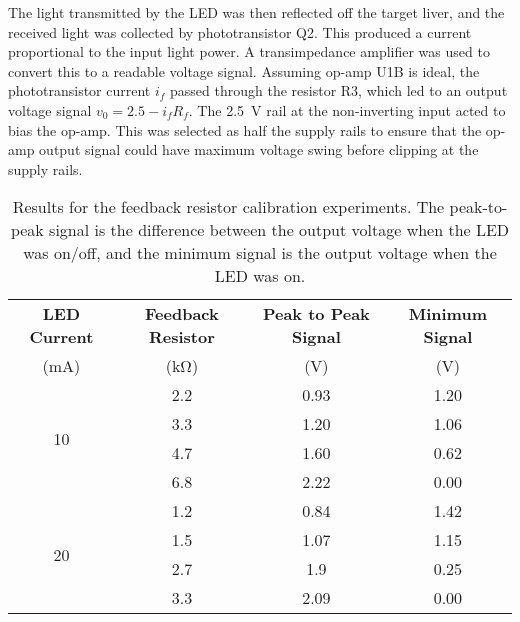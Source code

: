 The light transmitted by the LED was then reflected off the target liver, and the received light was collected by phototransistor Q2. This produced a current proportional to the input light power. A transimpedance amplifier was used to convert this to a readable voltage signal. Assuming op-amp U1B is ideal, the phototransistor current $i_f$ passed through the resistor R3, which led to an output voltage signal $v_0 = 2.5 - i_f R_f$. The \SI{2.5}{\volt} rail at the non-inverting input acted to bias the op-amp. This was selected as half the supply rails to ensure that the op-amp output signal could have maximum voltage swing before clipping at the supply rails.\\

\begin{table}[ht]
	\centering
	\caption{Results for the feedback resistor calibration experiments. The peak-to-peak signal is the difference between the output voltage when the LED was on/off, and the minimum signal is the output voltage when the LED was on.}
	\label{tab: tia feedback resistor}
	\begin{tabular}{|c|c|c|c|}
		\hline
		\textbf{LED Current} & \textbf{Feedback Resistor} & \textbf{Peak to Peak Signal} & \textbf{Minimum Signal}\\
		(mA)	&	(\si{\kilo\ohm})	&	(V)	&	(V)\\
		\hline
		\multirow{4}{*}{10}	&	2.2	&	0.93	&	1.20\\
						\cline{2-4}
						&	3.3	&	1.20	&	1.06\\
						\cline{2-4}
						&	4.7	&	1.60	&	0.62\\
						\cline{2-4}
						&	6.8	&	2.22	&	0.00\\
		\hline
		\multirow{4}{*}{20}	&	1.2	&	0.84	&	1.42\\
						\cline{2-4}
						&	1.5	&	1.07	&	1.15\\
						\cline{2-4}
						&	2.7	&	1.9	&	0.25\\
						\cline{2-4}
						&	3.3	&	2.09	&	0.00\\
		\hline
	\end{tabular}
\end{table}

